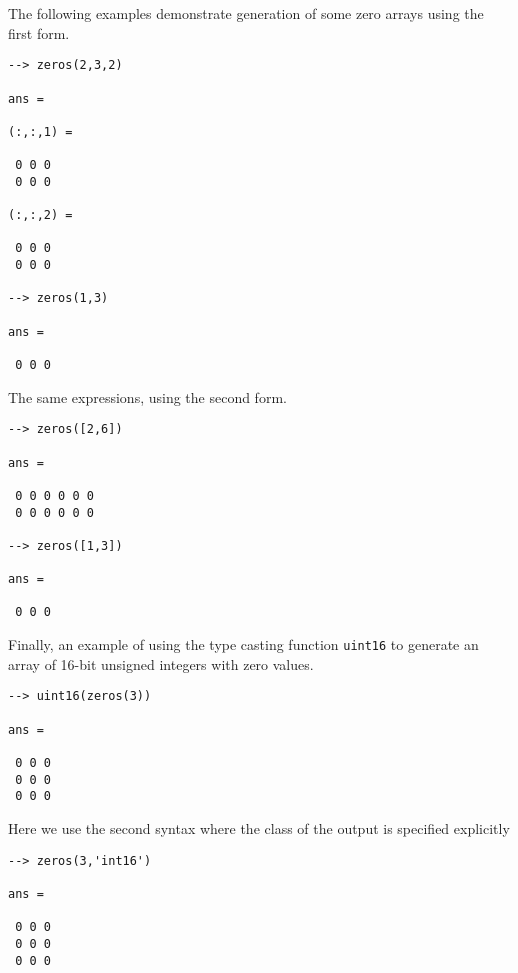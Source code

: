 The following examples demonstrate generation of some zero arrays 
using the first form.
\begin{verbatim}
--> zeros(2,3,2)

ans = 

(:,:,1) = 

 0 0 0 
 0 0 0 

(:,:,2) = 

 0 0 0 
 0 0 0 

--> zeros(1,3)

ans = 

 0 0 0 
\end{verbatim}
The same expressions, using the second form.
\begin{verbatim}
--> zeros([2,6])

ans = 

 0 0 0 0 0 0 
 0 0 0 0 0 0 

--> zeros([1,3])

ans = 

 0 0 0 
\end{verbatim}
Finally, an example of using the type casting function \verb|uint16| to generate an array of 16-bit unsigned integers with zero values.
\begin{verbatim}
--> uint16(zeros(3))

ans = 

 0 0 0 
 0 0 0 
 0 0 0 
\end{verbatim}
Here we use the second syntax where the class of the output is specified 
explicitly
\begin{verbatim}
--> zeros(3,'int16')

ans = 

 0 0 0 
 0 0 0 
 0 0 0 
\end{verbatim}
